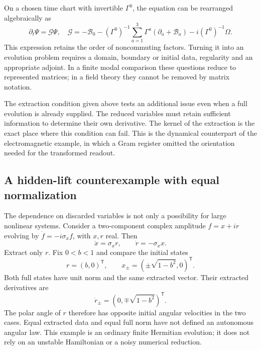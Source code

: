 On a chosen time chart with invertible $\Gamma^0$, the equation can
be rearranged algebraically as
\begin{equation}
 \partial_t\Psi=\mathcal G\Psi,
 \quad \mathcal G=-\mathcal B_0-(\Gamma^0)^{-1}
 \sum_{a=1}^3\Gamma^a(\partial_a+\mathcal B_a)
              -i(\Gamma^0)^{-1}\Omega.
\end{equation}
This expression retains the order of noncommuting factors. Turning it
into an evolution problem requires a domain, boundary or initial data,
regularity and an appropriate adjoint. In a finite modal comparison
these questions reduce to represented matrices; in a field theory they
cannot be removed by matrix notation.

The extraction condition given above tests an additional issue even
when a full evolution is already supplied. The reduced variables must
retain sufficient information to determine their own derivative.
The kernel of the extraction is the exact place where this condition
can fail. This is the dynamical counterpart of the electromagnetic
example, in which a Gram register omitted the orientation needed for
the transformed readout.

\subsection{A hidden-lift counterexample with equal normalization}
The dependence on discarded variables is not only a possibility for
large nonlinear systems. Consider a two-component complex amplitude
$f=x+ir$ evolving by $\dot f=-i\sigma_x f$, with $x,r$ real.
Then
\begin{equation}
 \dot x=\sigma_xr,\qquad\dot r=-\sigma_xx.
\end{equation}
Extract only $r$. Fix $0<b<1$ and compare the initial states
\begin{equation}
 r=(b,0)^{\mathsf T},\qquad
 x_\pm=(\pm\sqrt{1-b^2},0)^{\mathsf T}.
\end{equation}
Both full states have unit norm and the same extracted vector. Their
extracted derivatives are
\begin{equation}
 \dot r_\pm=(0,\mp\sqrt{1-b^2})^{\mathsf T}.
\end{equation}
The polar angle of $r$ therefore has opposite initial angular
velocities in the two cases. Equal extracted data and equal full
norm have not defined an autonomous angular law. This example is an
ordinary finite Hermitian evolution; it does not rely on an unstable
Hamiltonian or a noisy numerical reduction.

